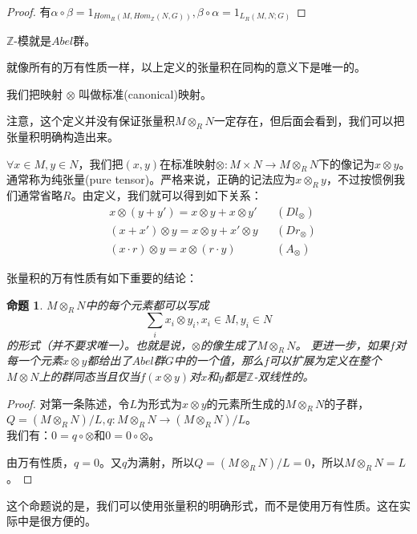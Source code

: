\documentclass{ctexart}
\newtheorem*{prop}{命题}
\begin{document}
\begin{enumerate}
\begin{proof}
有$\alpha \circ \beta = 1_{Hom_R(M,Hom_\mathbb{Z}(N,G))},
   \beta \circ \alpha = 1_{L_R(M,N;G)}$
\end{proof}

$\mathbb{Z}$-模就是$Abel$群。

就像所有的万有性质一样，以上定义的张量积在同构的意义下是唯一的。

我们把映射 $\otimes$ 叫做标准(canonical)映射。

注意，这个定义并没有保证张量积$M \otimes_R N$一定存在，但后面会看到，我们可以把张量积明确构造出来。

$\forall x \in M, y \in N$，我们把$(x,y)$在标准映射$\otimes : M \times N \to M \otimes_R N$下的像记为$x \otimes y$。通常称为纯张量(pure tensor)。严格来说，正确的记法应为$x \otimes_R y$，不过按惯例我们通常省略$R$。由定义，我们就可以得到如下关系：
\begin{align*}
&x \otimes (y+y') = x \otimes y + x \otimes y'&&\text{$(Dl_\otimes)$}\\
&(x+x') \otimes y = x \otimes y + x' \otimes y&&\text{$(Dr_\otimes)$}\\
&(x \cdot r) \otimes y = x \otimes (r \cdot y)&&\text{$(A_\otimes)$}
\end{align*}

张量积的万有性质有如下重要的结论：

\begin{prop}
$M \otimes_R N$中的每个元素都可以写成
\[
\sum_i x_i \otimes y_i, x_i \in M, y_i \in N
\]
的形式（并不要求唯一）。也就是说，$\otimes$的像生成了$M \otimes_R N$。 更进一步，如果$f$对每一个元素$x \otimes y$都给出了$Abel$群$G$中的一个值，那么$f$可以扩展为定义在整个$M \otimes N$上的群同态当且仅当$f(x \otimes y)$对$x$和$y$都是$\mathbb{Z}$-双线性的。
\end{prop}
\begin{proof}
对第一条陈述，令$L$为形式为$x \otimes y$的元素所生成的$M \otimes_R N$的子群，$Q = (M \otimes_R N)/L,  q : M \otimes_R N \to (M \otimes_R N) / L$。\\
我们有：$0 = q \circ \otimes$和$0 = 0 \circ \otimes$。
\begin{center}
\end{center}
由万有性质，$q = 0$。又$q$为满射，所以$Q = (M \otimes_R N)/L = 0$，所以$M \otimes_R N = L$。
\end{proof}
这个命题说的是，我们可以使用张量积的明确形式，而不是使用万有性质。这在实际中是很方便的。


\end{enumerate}
\end{document}
